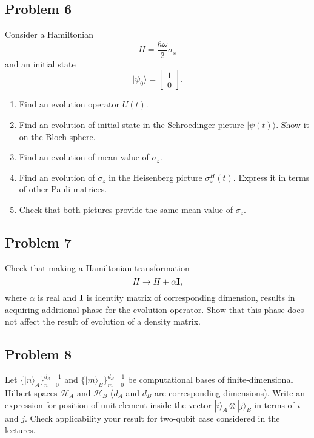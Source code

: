 \documentclass[a4paper,10pt]{article}
\newcommand{\ket}[1]{|#1\rangle}
\begin{document}
\subsection*{Problem 6}
Consider a Hamiltonian
\begin{equation}
	H = \frac{\hbar \omega}{2} \sigma_x
\end{equation}
and an initial state
\begin{equation}
	\ket{\psi_0} = \begin{bmatrix}
		1 \\ 0
	\end{bmatrix}.
\end{equation}
\begin{enumerate}
	\item Find an evolution operator $U(t)$.
	\item Find an evolution of initial state in the Schroedinger picture $\ket{\psi(t)}$. Show it on the Bloch sphere.
	\item Find an evolution of mean value of $\sigma_z$.
	\item Find an evolution of $\sigma_z$ in the Heisenberg picture $\sigma_z^H(t)$. Express it in terms of other Pauli matrices. 
	\item Check that both pictures provide the same mean value of $\sigma_z$.
\end{enumerate}


\subsection*{Problem 7}
Check that making a Hamiltonian transformation
\begin{equation}
	H \rightarrow H + \alpha {\bf I},
\end{equation}
where $\alpha$ is real and ${\bf I}$ is identity matrix of corresponding dimension, results in acquiring additional phase for the evolution operator.
Show that this phase does not affect the result of evolution of a density matrix.


\subsection*{Problem 8}
Let $\{\ket{n}_{A}\}_{n=0}^{d_{A}-1}$ and $\{\ket{m}_{B}\}_{m=0}^{d_{B}-1}$ be computational bases of finite-dimensional Hilbert spaces $\mathcal{H}_{A}$ and $\mathcal{H}_{B}$ ($d_{A}$ and $d_{B}$ are corresponding dimensions).
Write an expression for position of unit element inside the vector $\ket{i}_{A}\otimes \ket{j}_{B}$ in terms of $i$ and $j$.
Check applicability your result for two-qubit case considered in the lectures.
\end{document}
